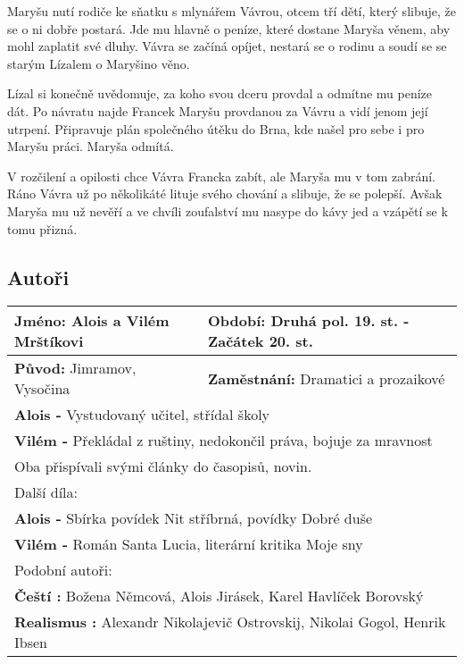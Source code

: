 Maryšu nutí rodiče ke sňatku s mlynářem Vávrou, otcem tří dětí, který slibuje, že se o ni dobře postará.
Jde mu hlavně o peníze, které dostane Maryša věnem, aby mohl zaplatit své dluhy.
Vávra se začíná opíjet, nestará se o rodinu a soudí se se starým Lízalem o Maryšino věno.

Lízal si konečně uvědomuje, za koho svou dceru provdal a odmítne mu peníze dát.
Po návratu najde Francek Maryšu provdanou za Vávru a vidí jenom její utrpení.
Připravuje plán společného útěku do Brna, kde našel pro sebe i pro Maryšu práci.
Maryša odmítá.

V rozčilení a opilosti chce Vávra Francka zabít, ale Maryša mu v tom zabrání.
Ráno Vávra už po několikáté lituje svého chování a slibuje, že se polepší.
Avšak Maryša mu už nevěří a ve chvíli zoufalství mu nasype do kávy jed a vzápětí se k tomu přizná.
\subsection*{Autoři}
\begin{tabularx}{\linewidth}{l|l}
  \textbf{Jméno:} Alois a Vilém Mrštíkovi & \textbf{Období:} Druhá pol. 19. st. - Začátek 20. st.       \\
  \hline
  \textbf{Původ:} Jimramov, Vysočina      & \textbf{Zaměstnání:} Dramatici a prozaikové                 \\
  \hline
  \multicolumn{2}{l}{\textbf{Alois -} Vystudovaný učitel, střídal školy}                                \\
  \multicolumn{2}{l}{\textbf{Vilém -} Překládal z ruštiny, nedokončil práva, bojuje za mravnost}        \\
  \multicolumn{2}{l}{Oba přispívali svými články do časopisů, novin.}                                   \\
  \hline
  \multicolumn{2}{l}{Další díla:}                                                                       \\
  \multicolumn{2}{l}{\textbf{Alois -} Sbírka povídek Nit stříbrná, povídky Dobré duše}                  \\
  \multicolumn{2}{l}{\textbf{Vilém -} Román Santa Lucia, literární kritika Moje sny}                    \\
  \hline
  \multicolumn{2}{l}{Podobní autoři:}                                                                   \\
  \multicolumn{2}{l}{\textbf{Čeští :} Božena Němcová, Alois Jirásek, Karel Havlíček Borovský}           \\
  \multicolumn{2}{l}{\textbf{Realismus :} Alexandr Nikolajevič Ostrovskij, Nikolai Gogol, Henrik Ibsen} \\
\end{tabularx}
